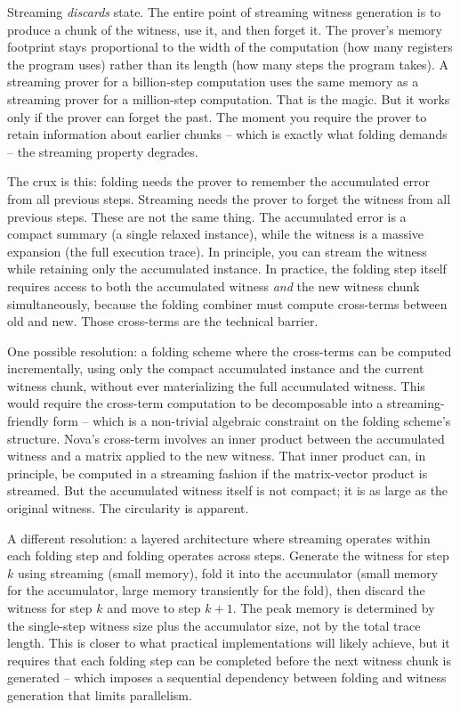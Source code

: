 \documentclass[
  11pt,
  openany]{report}
\begin{document}
Streaming \emph{discards} state. The entire point of streaming witness
generation is to produce a chunk of the witness, use it, and then forget it. The
prover's memory footprint stays proportional to the width of the computation
(how many registers the program uses) rather than its length (how many steps the
program takes). A streaming prover for a billion-step computation uses the same
memory as a streaming prover for a million-step computation. That is the magic.
But it works only if the prover can forget the past. The moment you require the
prover to retain information about earlier chunks -- which is exactly what
folding demands -- the streaming property degrades.

The crux is this: folding needs the prover to remember the accumulated error
from all previous steps. Streaming needs the prover to forget the witness from
all previous steps. These are not the same thing. The accumulated error is a
compact summary (a single relaxed instance), while the witness is a massive
expansion (the full execution trace). In principle, you can stream the witness
while retaining only the accumulated instance. In practice, the folding step
itself requires access to both the accumulated witness \emph{and} the new
witness chunk simultaneously, because the folding combiner must compute
cross-terms between old and new. Those cross-terms are the technical barrier.

One possible resolution: a folding scheme where the cross-terms can be computed
incrementally, using only the compact accumulated instance and the current
witness chunk, without ever materializing the full accumulated witness. This
would require the cross-term computation to be decomposable into a
streaming-friendly form -- which is a non-trivial algebraic constraint on the
folding scheme's structure. Nova's cross-term involves an inner product between
the accumulated witness and a matrix applied to the new witness. That inner
product can, in principle, be computed in a streaming fashion if the
matrix-vector product is streamed. But the accumulated witness itself is not
compact; it is as large as the original witness. The circularity is apparent.

A different resolution: a layered architecture where streaming operates within
each folding step and folding operates across steps. Generate the witness for
step \(k\) using streaming (small memory), fold it into the accumulator (small
memory for the accumulator, large memory transiently for the fold), then discard
the witness for step \(k\) and move to step \(k+1\). The peak memory is
determined by the single-step witness size plus the accumulator size, not by the
total trace length. This is closer to what practical implementations will likely
achieve, but it requires that each folding step can be completed before the next
witness chunk is generated -- which imposes a sequential dependency between
folding and witness generation that limits parallelism.
\end{document}
